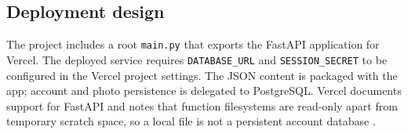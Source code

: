 \subsection{Deployment design}
The project includes a root \texttt{main.py} that exports the FastAPI application for Vercel. The deployed service requires \texttt{DATABASE\_URL} and \texttt{SESSION\_SECRET} to be configured in the Vercel project settings. The JSON content is packaged with the app; account and photo persistence is delegated to PostgreSQL. Vercel documents support for FastAPI and notes that function filesystems are read-only apart from temporary scratch space, so a local file is not a persistent account database \cite{vercelFastapi,vercelFilesystem}.
